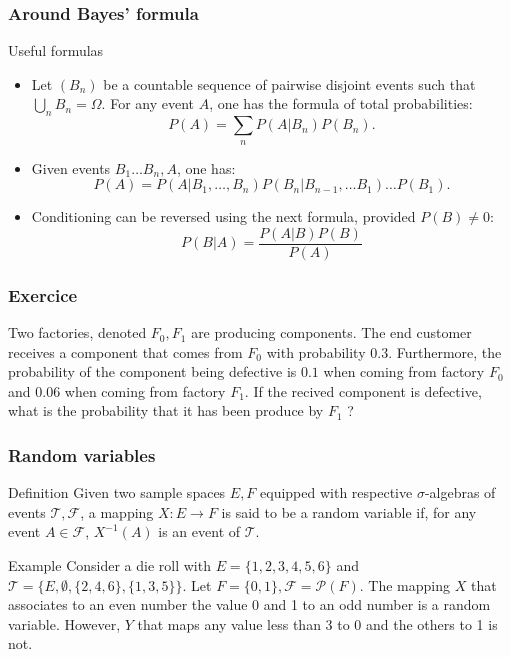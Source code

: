 \begin{frame}
    \frametitle{Around Bayes' formula}
    \begin{block}{Useful formulas}
    \begin{itemize}
        \item<+-> Let $\left(B_n\right)$ be a countable sequence of pairwise disjoint events such that $\bigcup_n B_n = \Omega.$ For any event $A$,
        one has the formula of total probabilities:
        \begin{equation}
            P\left( A \right) = \sum_n P\left( A \vert B_n \right) P\left( B_n \right).
        \end{equation}
        \item<+-> Given events $B_1 \dots B_n, A$, one has:
        \begin{equation}
            P\left( A \right) = P\left( A \vert B_1, \dots, B_n \right)P(B_n \vert B_{n-1}, \dots B_1)\dots P\left( B_1 \right).
        \end{equation}
        \item<+-> Conditioning can be reversed using the next formula, provided $P(B) \neq 0:$
        \begin{equation}
            P\left( B \vert A \right) = \frac{P\left( A \vert B \right) P(B)}{P(A)}
        \end{equation}
       \end{itemize}
    \end{block}
\end{frame}
\begin{frame}
    \frametitle{Exercice}
Two factories, denoted $F_0, F_1$ are producing components.  The end customer 
receives a component that comes from $F_0$ with probability $0.3$. Furthermore,
the probability of the component being defective is $0.1$ when coming from factory $F_0$
and $0.06$ when coming from factory $F_1$. If the recived component is defective,
what is the probability that it has been produce by $F_1$ ?

\end{frame}
\begin{frame}
    \frametitle{Random variables}
\begin{block}{Definition}
    Given two sample spaces $E,F$ equipped with respective $\sigma$-algebras of events 
    $\mathcal{T},\mathcal{F}$, a mapping $X \colon E \to F$ is said to be 
    a random variable if, for any event $A \in \mathcal{F}$, $X^{-1}\left( A \right)$
    is an event of $\mathcal{T}.$
\end{block}
\begin{block}{Example}
    Consider a die roll with $E=\{1,2,3,4,5,6\}$ and 
    $\mathcal{T}=\{E,\emptyset,\{2,4,6\},\{1,3,5\}\}$. Let $F=\{0,1\}, \mathcal{F}=\mathcal{P}(F).$
    The mapping $X$ that associates to an even number the value 0 and 1 to an odd number
    is a random variable. However, $Y$ that maps any value less than 3 to 0 and the
    others to 1 is not.
\end{block}
\end{frame}
